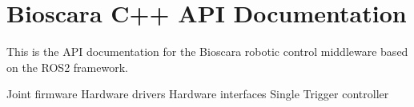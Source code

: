 \chapter{Bioscara C++ API Documentation}
\hypertarget{index}{}\label{index}
\label{index_md_docs_2doxygen_2index}%
%
This is the API documentation for the Bioscara robotic control middleware based on the ROS2 framework.

Joint firmware Hardware drivers Hardware interfaces Single Trigger controller 
